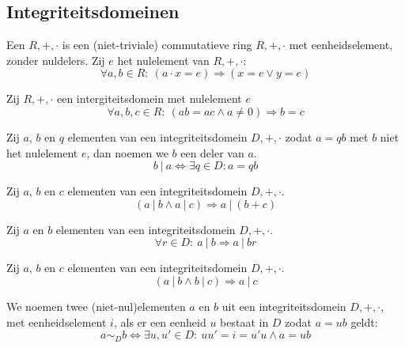 \documentclass[main.tex]{subfiles}
\begin{document}
\subsection{Integriteitsdomeinen}
\label{sec:integriteitsdomeinen}

\begin{de}
  Een  $R,+,\cdot$ is een (niet-triviale) commutatieve ring $R,+,\cdot$ met eenheidselement, zonder nuldelers.
  Zij $e$ het nulelement van $R,+,\cdot$:
  \[ \forall a, b \in R:\ (a \cdot x = e) \Rightarrow (x = e \vee y = e) \]
\end{de}

\begin{ei}
  Zij $R,+,\cdot$ een intergiteitsdomein met nulelement $e$
  \[ \forall a,b,c \in R:\ (ab = ac \wedge a \neq 0) \Rightarrow b = c \]
\end{ei}

\begin{de}
  Zij $a$, $b$ en $q$ elementen van een integriteitsdomein $D,+,\cdot$ zodat $a= qb$ met $b$ niet het nulelement $e$, dan noemen we $b$ een deler van $a$.
  \[ b\ |\ a \Leftrightarrow \exists q \in D: a = qb \]
\end{de}

\begin{st}
  Zij $a$, $b$ en $c$ elementen van een integriteitsdomein $D,+,\cdot$.
  \[ (a\ |\ b \wedge a\ |\ c) \Rightarrow a\ |\ (b+c) \]
\end{st}

\begin{st}
  Zij $a$ en $b$ elementen van een integriteitsdomein $D,+,\cdot$.
  \[ \forall r \in D:\ a\ |\ b \Rightarrow a\ |\ br  \]
\end{st}

\begin{st}
  Zij $a$, $b$ en $c$ elementen van een integriteitsdomein $D,+,\cdot$.
  \[ (a\ |\ b \wedge b\ |\ c) \Rightarrow a\ |\ c \]
\end{st}

\begin{de}
  We noemen twee (niet-nul)elementen $a$ en $b$ uit een integriteitsdomein $D,+,\cdot$, met eenheidselement $i$,  als er een eenheid $u$ bestaat in $D$ zodat $a=ub$ geldt:
  \[ a \sim_{D} b \Leftrightarrow \exists u,u'\in D:\ uu'= i = u'u \wedge a = ub \]
\end{de}
\end{document}
